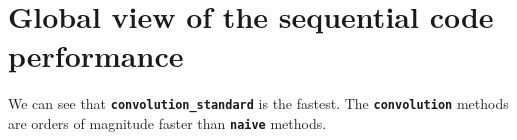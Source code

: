 \section{Global view of the sequential code performance}

We can see that \texttt{\textbf{convolution\_standard}} is the fastest.
The \texttt{\textbf{convolution}} methods are orders of magnitude faster
than \texttt{\textbf{naive}} methods.
